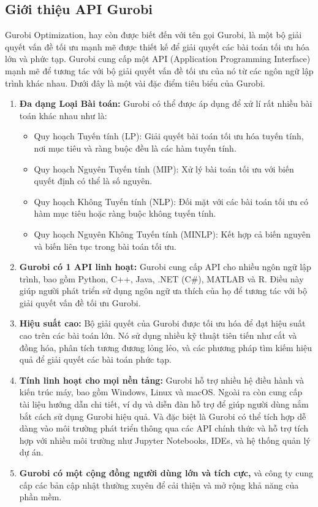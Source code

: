 \documentclass[a4paper]{article}
\begin{document}
       \subsection{Giới thiệu API Gurobi }
Gurobi Optimization, hay còn được biết đến với tên gọi Gurobi, là một bộ giải quyết vấn đề tối ưu mạnh mẽ được thiết kế để giải quyết các bài toán tối ưu hóa lớn và phức tạp. Gurobi cung cấp một API (Application Programming Interface) mạnh mẽ để tương tác với bộ giải quyết vấn đề tối ưu của nó từ các ngôn ngữ lập trình khác nhau. Dưới đây là một vài đặc điểm tiêu biểu của Gurobi.
\begin{enumerate}
\item \textbf{Đa dạng Loại Bài toán:} Gurobi có thể được áp dụng để xử lí rất nhiều bài toán khác nhau như là:
\begin{itemize}
\item Quy hoạch Tuyến tính (LP): Giải quyết bài toán tối ưu hóa tuyến tính, nơi mục tiêu và ràng buộc đều là các hàm tuyến tính.
\item Quy hoạch Nguyên Tuyến tính (MIP): Xử lý bài toán tối ưu với biến quyết định có thể là số nguyên.
\item Quy hoạch Không Tuyến tính (NLP): Đối mặt với các bài toán tối ưu có hàm mục tiêu hoặc ràng buộc không tuyến tính.
\item Quy hoạch Nguyên Không Tuyến tính (MINLP): Kết hợp cả biến nguyên và biến liên tục trong bài toán tối ưu.
\end{itemize}

\item \textbf{Gurobi có 1 API linh hoạt:} Gurobi cung cấp API cho nhiều ngôn ngữ lập trình, bao gồm Python, C++, Java, .NET (C\#), MATLAB và R. Điều này giúp người phát triển sử dụng ngôn ngữ ưa thích của họ để tương tác với bộ giải quyết vấn đề tối ưu Gurobi.

\item \textbf{Hiệu suất cao:} Bộ giải quyết của Gurobi được tối ưu hóa để đạt hiệu suất cao trên các bài toán lớn. Nó sử dụng nhiều kỹ thuật tiên tiến như cắt và đồng hóa, phân tích tương đương lỏng lẻo, và các phương pháp tìm kiếm hiệu quả để giải quyết các bài toán phức tạp.

\item \textbf{Tính linh hoạt cho mọi nền tảng:} Gurobi hỗ trợ nhiều hệ điều hành và kiến trúc máy, bao gồm Windows, Linux và macOS. Ngoài ra còn cung cấp tài liệu hướng dẫn chi tiết, ví dụ và diễn đàn hỗ trợ để giúp người dùng nắm bắt cách sử dụng Gurobi hiệu quả. Và đặc biệt là Gurobi có thể tích hợp dễ dàng vào môi trường phát triển thông qua các API chính thức và hỗ trợ tích hợp với nhiều môi trường như Jupyter Notebooks, IDEs, và hệ thống quản lý dự án.

\item \textbf{Gurobi có một cộng đồng người dùng lớn và tích cực,} và công ty cung cấp các bản cập nhật thường xuyên để cải thiện và mở rộng khả năng của phần mềm.
\end{enumerate}
\end{document}
